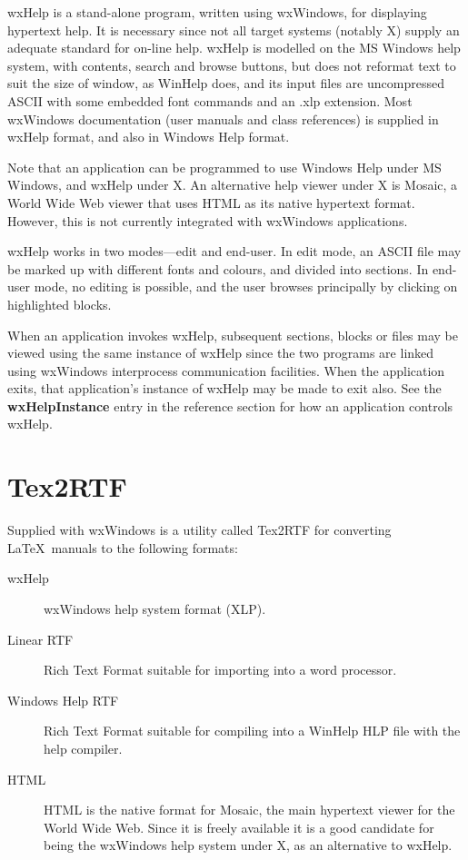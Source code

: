 wxHelp is a stand-alone program, written using wxWindows,
for displaying hypertext help. It is necessary since not all target
systems (notably X) supply an adequate
standard for on-line help. wxHelp is modelled on the MS Windows help
system, with contents, search and browse buttons, but does not reformat
text to suit the size of window, as WinHelp does, and its input files
are uncompressed ASCII with some embedded font commands and an .xlp
extension. Most wxWindows documentation (user manuals and class
references) is supplied in wxHelp format, and also in Windows Help
format.

Note that an application can be programmed to use Windows Help under
MS Windows, and wxHelp under X. An alternative help viewer under X is
Mosaic, a World Wide Web viewer that uses HTML as its native hypertext
format. However, this is not currently integrated with wxWindows
applications.

wxHelp works in two modes---edit and end-user. In edit mode, an ASCII
file may be marked up with different fonts and colours, and divided into
sections. In end-user mode, no editing is possible, and the user browses
principally by clicking on highlighted blocks.

When an application invokes wxHelp, subsequent sections, blocks or
files may be viewed using the same instance of wxHelp since the two
programs are linked using wxWindows interprocess communication
facilities. When the application exits, that application's instance of
wxHelp may be made to exit also.  See the {\bf wxHelpInstance} entry in the
reference section for how an application controls wxHelp.

\section{Tex2RTF}\label{textortf}

Supplied with wxWindows is a utility called Tex2RTF for converting\rtfsp
\LaTeX\ manuals to the following formats:

\begin{description}
\item[wxHelp]
wxWindows help system format (XLP).
\item[Linear RTF]
Rich Text Format suitable for importing into a word processor.
\item[Windows Help RTF]
Rich Text Format suitable for compiling into a WinHelp HLP file with the
help compiler.
\item[HTML]
HTML is the native format for Mosaic, the main hypertext viewer for
the World Wide Web. Since it is freely available it is a good candidate
for being the wxWindows help system under X, as an alternative to wxHelp.
\end{description}

